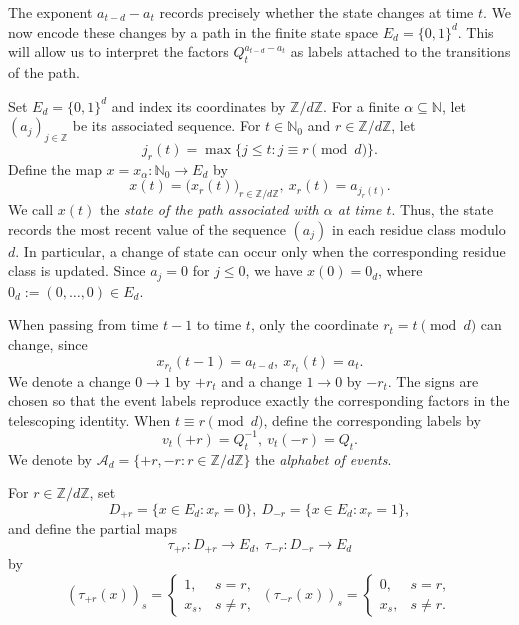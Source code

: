\documentclass[11pt]{amsart}
\theoremstyle{definition}
\theoremstyle{remark}
\newcommand{\N}{\mathbb N}
\newcommand{\Nzero}{\mathbb N_0}
\newcommand{\Z}{\mathbb Z}
\begin{document}
The exponent $a_{t-d}-a_t$ records precisely whether the state changes at time $t$. We now encode these changes by a path in the finite state space $E_d=\{0,1\}^d$. This will allow us to interpret the factors $Q_t^{a_{t-d}-a_t}$ as labels attached to the transitions of the path.


Set $E_d=\{0,1\}^d$ and index its coordinates by $\Z/d\Z$.
For a finite $\alpha\subseteq\N$, let $(a_j)_{j\in\Z}$ be its associated
sequence.  For $t\in\Nzero$ and $r\in\Z/d\Z$, let
\[
 j_r(t)=\max\{j\leq t:j\equiv r\pmod d\}.
\]
Define the map $x=x_\alpha:\Nzero\to E_d$ by
\[
 x(t)=\bigl(x_r(t)\bigr)_{r\in\Z/d\Z},
 \  x_r(t)=a_{j_r(t)}.
\]
We call $x(t)$ the \emph{state of the path associated with $\alpha$ at time $t$}. Thus, the state records the most recent value of the sequence $(a_j)$ in each residue class modulo $d$. In particular, a change of state can occur only when the corresponding residue class is updated.
Since $a_j=0$ for $j\leq0$, we have $x(0)=0_d$, where $0_d:=(0,\ldots,0)\in E_d$.

When passing from time $t-1$ to time $t$, only the coordinate
$r_t=t\pmod d$ can change, since
\[
 x_{r_t}(t-1)=a_{t-d}, \  x_{r_t}(t)=a_t.
\]
We denote a change $0\to1$ by $+r_t$ and a change $1\to0$ by $-r_t$. The signs are chosen so that the event labels reproduce exactly the corresponding factors in the telescoping identity. 
When $t\equiv r\pmod d$, define the corresponding labels by
\[
 v_t(+r)=Q_t^{-1}, \ v_t(-r)=Q_t.
\]
We denote by $\mathcal A_d=\{+r,-r:r\in\Z/d\Z\}$ the \emph{alphabet of events}.
 
For $r\in\Z/d\Z$, set
\[
 D_{+r}=\{x\in E_d:x_r=0\}, \  D_{-r}=\{x\in E_d:x_r=1\},
\]
and define the partial maps
\[
 \tau_{+r}:D_{+r}\longrightarrow E_d,
 \  \tau_{-r}:D_{-r}\longrightarrow E_d
\]
by
\[
 (\tau_{+r}(x))_s= \begin{cases}
  1,&s=r,\\
  x_s,&s\neq r,
 \end{cases}
 \ 
 (\tau_{-r}(x))_s=\begin{cases}
  0,&s=r,\\
  x_s,&s\neq r.
 \end{cases}
\]
\end{document}
